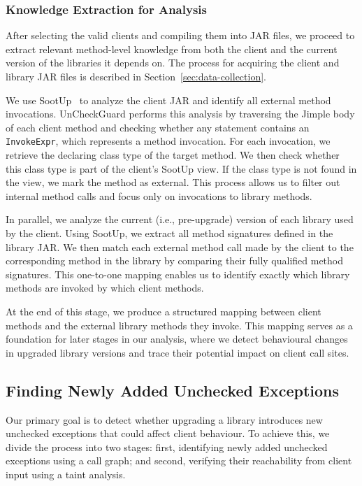 
\subsubsection{Knowledge Extraction for Analysis}

After selecting the valid clients and compiling them into JAR files, we proceed to extract relevant method-level knowledge from both the client and the current version of the libraries it depends on. The process for acquiring the client and library JAR files is described in Section~\ref{sec:data-collection}.

We use SootUp~\cite{Karakaya24:_sootup} to analyze the client JAR and identify all external method invocations. UnCheckGuard performs this analysis by traversing the Jimple body of each client method and checking whether any statement contains an \texttt{InvokeExpr}, which represents a method invocation. For each invocation, we retrieve the declaring class type of the target method. We then check whether this class type is part of the client’s SootUp view. If the class type is not found in the view, we mark the method as external. This process allows us to filter out internal method calls and focus only on invocations to library methods.

In parallel, we analyze the current (i.e., pre-upgrade) version of each library used by the client. Using SootUp, we extract all method signatures defined in the library JAR. We then match each external method call made by the client to the corresponding method in the library by comparing their fully qualified method signatures. This one-to-one mapping enables us to identify exactly which library methods are invoked by which client methods.

At the end of this stage, we produce a structured mapping between client methods and the external library methods they invoke. This mapping serves as a foundation for later stages in our analysis, where we detect behavioural changes in upgraded library versions and trace their potential impact on client call sites.

\subsection{Finding Newly Added Unchecked Exceptions}

Our primary goal is to detect whether upgrading a library introduces new unchecked exceptions that could affect client behaviour. To achieve this, we divide the process into two stages: first, identifying newly added unchecked exceptions using a call graph; and second, verifying their reachability from client input using a taint analysis.

